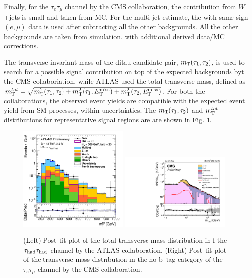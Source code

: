 Finally, for the $\tau_{e}\tau_{\mu}$ channel by the CMS collaboration, the contribution from $W$+jets is small and taken from MC. For the multi-jet estimate,  the with same sign $(e,\mu)$ data is used after subtracting all the other backgrounds. All the other backgrounds are taken from simulation, with additional derived data/MC corrections.

The transverse invariant mass of the ditau candidate pair, $m_{\rm T}(\tau_{1},\tau_{2})$, is used to search for a possible
signal contribution on top of the expected backgrounds byt the CMS collaboriation, while ATLAS used the total transverse mass, defined as $m_{\rm T}^{tot}=\sqrt{m_{\rm T}^{2}(\tau_{1},\tau_{2})+m_{\rm T}^{2}(\tau_{1},E_{\rm T}^{\rm miss})+m_{\rm T}^{2}(\tau_{2},E_{\rm T}^{\rm miss})}$. 
For both the collaborations, the observed event yields are compatible with the expected event yield from SM processes, within uncertainties. The $m_{\rm T}(\tau_{1},\tau_{2})$ and $m_{\rm T}^{tot}$ distributions for representative signal regions are  are shown in Fig. \ref{fig_1Htautau}.
\begin{figure}
\centering
\includegraphics[width=0.48\textwidth, angle=0] {figures/fig_1Htautau_a.pdf}
\includegraphics[width=0.48\textwidth, angle=0] {figures/fig_1Htautau_b.pdf}
\caption{ (Left) Post--fit plot of the total transverse mass distribution in f the $\tau_{\rm had}\tau_{\rm had}$ channel by the ATLAS collaboration. (Right) Post--fit plot of the transverse mass distribution in the no b--tag category of the $\tau_{e}\tau_{\mu}$ channel by the CMS collaboration.}
\label{fig_1Htautau}   
\end{figure}

